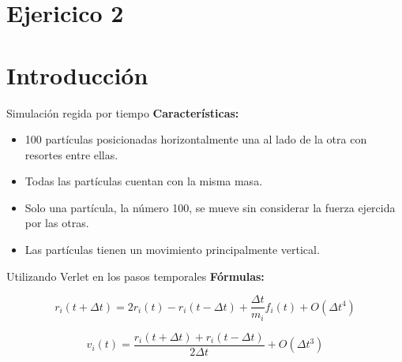 \section{Ejericico 2}\label{sec:ejer2}


\section{Introducción}\label{sec:introduccion}
\begin{frame}{Simulación regida por tiempo}
    \textbf{Características:}
    \begin{itemize}
        \item 100 partículas posicionadas horizontalmente una al lado de la otra con resortes entre ellas.
        \item Todas las partículas cuentan con la misma masa.
        \item Solo una partícula, la número 100, se mueve sin considerar la fuerza ejercida por las otras.
        \item Las partículas tienen un movimiento principalmente vertical.
    \end{itemize}
\end{frame}


\begin{frame}{Utilizando Verlet en los pasos temporales}
    \textbf{Fórmulas:}

    \vspace{5pt}
    \begin{equation*}
        r_i(t + \Delta{t}) = 2 r_i(t) - r_i(t-\Delta{t}) + \frac{\Delta{t}}{m_i} f_i(t) + O(\Delta{t}^4)
    \end{equation*}
    
    \vspace{20pt}
    \begin{equation*}
        v_i(t) = \frac{r_i(t+\Delta{t}) + r_i(t-\Delta{t})}{2\Delta{t}} + O(\Delta{t}^3)
    \end{equation*}
\end{frame}

